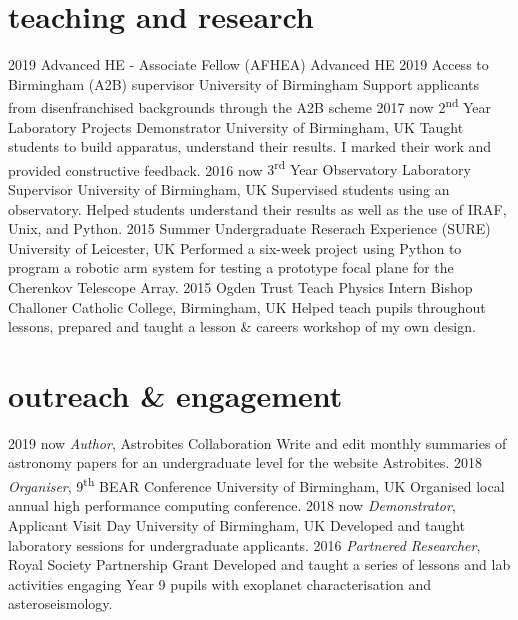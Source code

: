 \documentclass[]{k-cv} %
\begin{document}
\section{teaching and research}
\begin{entrylist}
\entry
{2019}
{Advanced HE - Associate Fellow (AFHEA)}
{Advanced HE}
{}
\entry
{2019}
{Access to Birmingham (A2B) supervisor}
{University of Birmingham}
{Support applicants from disenfranchised backgrounds through the A2B scheme}
\entry
{2017 \to now}
{2\textsuperscript{nd} Year Laboratory Projects Demonstrator}
{University of Birmingham, UK}
{Taught students to build apparatus, understand their results. I marked their work and provided constructive feedback.}
\entry
{2016 \to now}
{3\textsuperscript{rd} Year Observatory Laboratory Supervisor}
{University of Birmingham, UK}
{Supervised students using an observatory. Helped students understand their results as well as the use of IRAF, Unix, and Python.}
\entry
{2015}
{Summer Undergraduate Reserach Experience (SURE)}
{University of Leicester, UK}
{Performed a six-week project using Python to program a robotic arm system for testing a prototype focal plane for the Cherenkov Telescope Array.}
\entry
{2015}
{Ogden Trust Teach Physics Intern}
{Bishop Challoner Catholic College, Birmingham, UK}
{Helped teach pupils throughout lessons, prepared and taught a lesson \& careers workshop of my own
design.}
\end{entrylist}




\section{outreach \& engagement}

\begin{entrylist}
\entry
{2019 \to now}
{\emph{Author}, Astrobites Collaboration}
{}
{Write and edit monthly summaries of astronomy papers for an undergraduate level for the website Astrobites.}
\entry
{2018 }
{\emph{Organiser}, 9\textsuperscript{th} BEAR Conference}
{University of Birmingham, UK}
{Organised local annual high performance computing conference.}
\entry
{2018 \to now}
{\emph{Demonstrator}, Applicant Visit Day}
{University of Birmingham, UK}
{Developed and taught laboratory sessions for undergraduate applicants.}
\entry
{2016 }
{\emph{Partnered Researcher}, Royal Society Partnership Grant}
{}
{Developed and taught a series of lessons and lab activities engaging Year 9 pupils with exoplanet characterisation and asteroseismology.}
\end{entrylist}
\end{document}
